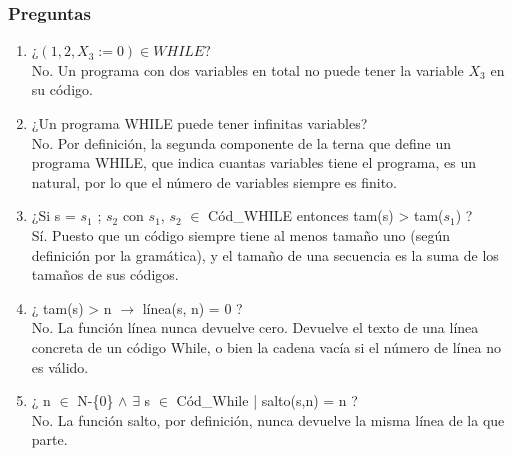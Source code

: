 \documentclass[xcolor=table]{beamer}
\begin{document}
\begin{frame}[fragile]\frametitle{Preguntas} \footnotesize

\begin{enumerate}\footnotesize
    \item ¿$ (1,2,X_3:=0) \in WHILE?$\\
    \hspace{0.3cm} \scriptsize  \textcolor{chicagoblue}{No.	Un	programa	con	dos	variables	en	total	no	puede	tener	la	variable	$X_3$ en	su	código.}
    \footnotesize
    \item ¿Un	programa	WHILE	puede	tener	infinitas	variables?\\
        \hspace{0.3cm} \scriptsize \textcolor{chicagoblue}{No.	Por	definición,	la	segunda	componente	de	la	terna	que	define	un	programa	WHILE,	que	indica	cuantas	variables tiene	el	programa,	es	un	natural,	por	lo	que	el	número	de	variables	siempre	es	finito.}
    \footnotesize
    
    \item ¿Si	s	=	$s_1$	;	$s_2$	con	$s_1$,	$s_2$	$\in$ Cód\_WHILE	entonces	tam(s)	>	tam($s_1$)	?\\
        \hspace{0.3cm} \scriptsize \textcolor{chicagoblue}{Sí.	Puesto	que	un	código	siempre	tiene	al	menos	tamaño	uno (según	definición	por	la	gramática),	y	el	tamaño	de	una	 secuencia	es	la	suma	de	los	tamaños	de	sus	códigos.}
    \footnotesize
    \item ¿	tam(s)	>	n	$\rightarrow$ línea(s,	n)	=	0	?\\
        \hspace{0.3cm} \scriptsize \textcolor{chicagoblue}{No.	 La	 función	 línea	 nunca	 devuelve	 cero.	 Devuelve	 el	 texto	 de	 una	 línea	 concreta	 de	 un	 código	 While,	 o	 bien	 la	 cadena	vacía	si	el	número	de	línea	no	es	válido.}
    \footnotesize
    \item ¿	n $\in$ N-\{0\} $\wedge$ $\exists$ s $\in$ Cód\_While |	salto(s,n)	=	n	? \\
       \hspace{0.3cm}  \scriptsize \textcolor{chicagoblue}{No.	La	función	salto,	por	definición,	nunca	devuelve	la	misma	línea	de	la	que	parte.}
       
\end{enumerate}


\end{frame}

\end{document}
